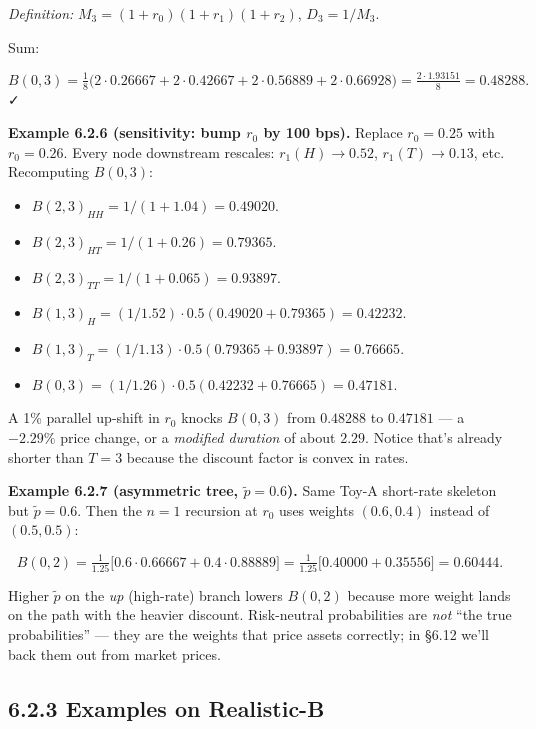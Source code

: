 \documentclass[
  10pt,
  twoside]{book}
\providecommand{\tightlist}{%
  \setlength{\itemsep}{0pt}\setlength{\parskip}{0pt}}
\begin{document}
\emph{Definition:} \(M_3 = (1+r_0)(1+r_1)(1+r_2)\), \(D_3 = 1/M_3\).

Sum:

\[B(0, 3) = \tfrac{1}{8}\bigl(2 \cdot 0.26667 + 2 \cdot 0.42667 + 2 \cdot 0.56889 + 2 \cdot 0.66928\bigr) = \tfrac{2 \cdot 1.93151}{8} = 0.48288.\]
✓

\textbf{Example 6.2.6 (sensitivity: bump \(r_0\) by 100 bps).} Replace
\(r_0 = 0.25\) with \(r_0 = 0.26\). Every node downstream rescales:
\(r_1(H) \to 0.52\), \(r_1(T) \to 0.13\), etc. Recomputing \(B(0, 3)\):

\begin{itemize}
\tightlist
\item
  \(B(2, 3)_{HH} = 1/(1 + 1.04) = 0.49020\).
\item
  \(B(2, 3)_{HT} = 1/(1 + 0.26) = 0.79365\).
\item
  \(B(2, 3)_{TT} = 1/(1 + 0.065) = 0.93897\).
\item
  \(B(1, 3)_H = (1/1.52) \cdot 0.5(0.49020 + 0.79365) = 0.42232\).
\item
  \(B(1, 3)_T = (1/1.13) \cdot 0.5(0.79365 + 0.93897) = 0.76665\).
\item
  \(B(0, 3) = (1/1.26) \cdot 0.5(0.42232 + 0.76665) = 0.47181\).
\end{itemize}

A 1\% parallel up-shift in \(r_0\) knocks \(B(0, 3)\) from \(0.48288\)
to \(0.47181\) --- a \(-2.29\%\) price change, or a \emph{modified
duration} of about \(2.29\). Notice that's already shorter than
\(T = 3\) because the discount factor is convex in rates.

\textbf{Example 6.2.7 (asymmetric tree, \(\tilde p = 0.6\)).} Same Toy-A
short-rate skeleton but \(\tilde p = 0.6\). Then the \(n=1\) recursion
at \(r_0\) uses weights \((0.6, 0.4)\) instead of \((0.5, 0.5)\):

\[B(0, 2) = \tfrac{1}{1.25}\bigl[0.6 \cdot 0.66667 + 0.4 \cdot 0.88889\bigr] = \tfrac{1}{1.25}\bigl[0.40000 + 0.35556\bigr] = 0.60444.\]

Higher \(\tilde p\) on the \emph{up} (high-rate) branch lowers
\(B(0, 2)\) because more weight lands on the path with the heavier
discount. Risk-neutral probabilities are \emph{not} ``the true
probabilities'' --- they are the weights that price assets correctly; in
§6.12 we'll back them out from market prices.

\subsection{6.2.3 Examples on
Realistic-B}\label{examples-on-realistic-b-1}
\end{document}
